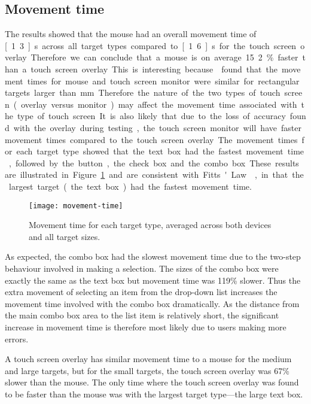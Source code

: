 \documentclass{elsart}
\begin{document}
\subsection{Movement time}
\label{sec-results-movement}

The results showed that the mouse had an overall movement time of
\unit[1.3]{s} across all target types compared to \unit[1.6]{s} for the
touch screen overlay. Therefore we can conclude that a mouse is on average
15.2\% faster than a touch screen overlay. This is interesting because
\citet{Sear-A-1991-IJMMS} found that the movement times for mouse and
touch screen monitor were similar for rectangular targets larger than
\unit[2]{mm}. Therefore the nature of the two types of touch screen
(overlay versus monitor) may affect the movement time associated with
the type of touch screen. It is also likely that due to the loss of
accuracy found with the overlay during testing, the touch screen monitor
will have faster movement times compared to the touch screen overlay.

The movement times for each target type showed that the text box had the
fastest movement time, followed by the button, the check box and the
combo box. These results are illustrated in
Figure~\ref{fig-movement-time} and are consistent with Fitts' Law
\citep{Fitt-PM-1954-Law}, in that the largest target (the text box) had
the fastest movement time.


\begin{figure}
	\centering
	\texttt{[image: movement-time]}
	\caption{Movement time for each target type, averaged across both
	devices and all target sizes.}
	\label{fig-movement-time}
\end{figure}


As expected, the combo box had the slowest movement time due to the
two-step behaviour involved in making a selection. The sizes of the
combo box were exactly the same as the text box but movement time was
119\% slower. Thus the extra movement of selecting an item from the
drop-down list increases the movement time involved with the combo box
dramatically. As the distance from the main combo box area to the list
item is relatively short, the significant increase in movement time is
therefore most likely due to users making more errors.

A touch screen overlay has similar movement time to a mouse for the
medium and large targets, but for the small targets, the touch screen
overlay was 67\% slower than the mouse. The only time where the touch
screen overlay was found to be faster than the mouse was with the
largest target type---the large text box.
\end{document}
